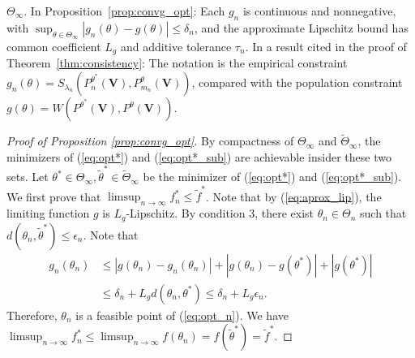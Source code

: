 $\Theta_\infty$. In Proposition~\ref{prop:convg_opt}: Each $g_n$ is continuous and nonnegative, with $\sup_{\theta\in\Theta_\infty}|g_n(\theta)-g(\theta)|\leqslant\delta_n$, and the approximate Lipschitz bound has common coefficient $L_g$ and additive tolerance $\tau_n$. In a result cited in the proof of Theorem~\ref{thm:consistency}: The notation is the empirical constraint $g_n(\theta)=S_{\lambda_n}(P_n^{\theta^*}(\boldsymbol V),P_{m_n}^{\theta}(\boldsymbol V))$, compared with the population constraint $g(\theta)=W(P^{\theta^*}(\boldsymbol V),P^{\theta}(\boldsymbol V))$.

\begin{proof}[Proof of Proposition \ref{prop:convg_opt}]\label{proof:convg_opt}
  By compactness of $\Theta_\infty$ and $\tilde{\Theta}_\infty $, the minimizers of (\ref{eq:opt*}) and (\ref{eq:opt*_sub}) are achievable insider these two sets.  Let $ \theta^* \in \Theta_\infty, \tilde{\theta}^* \in 
  \tilde{\Theta}_\infty$ be the minimizer of (\ref{eq:opt*}) and (\ref{eq:opt*_sub}). We first prove that $\limsup _{n\rightarrow \infty } f_{n}^{*} \leqslant \tilde{f}^{*}$. Note that by (\ref{eq:aprox_lip}), the limiting function $ g$ is $ L_{g}$-Lipschitz. By condition 3, there exist $ \theta _{n} \in \Theta _{n}$ such that $ d\left( \theta _{n} ,\tilde{\theta} ^{*}\right) \leqslant \epsilon _{n}$. Note that 
\begin{align*}
g_{n}( \theta _{n}) & \leqslant |g( \theta _{n}) -g_{n}( \theta _{n}) |+|g( \theta _{n}) -g\left( \theta ^{*}\right) |+|g\left( \theta ^{*}\right) |\\
 & \leqslant \delta _{n} +L_{g} d\left( \theta _{n} ,\theta ^{*}\right) \leqslant \delta _{n} +L_{g} \epsilon _{n} .
\end{align*}
Therefore, $ \theta _{n}$ is a feasible point of (\ref{eq:opt_n}). We have $ \limsup _{n\rightarrow \infty } f_{n}^{*} \leqslant \limsup _{n\rightarrow \infty } f( {\theta} _{n}) = f\left( \tilde{\theta} ^{*}\right) =\tilde{f}^{*}$.\par 


\end{proof}
